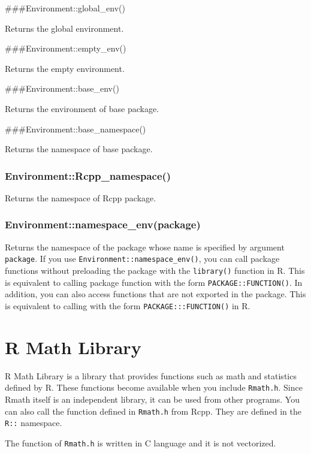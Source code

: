 \documentclass[]{book}
\begin{document}
\#\#\#Environment::global\_env()

Returns the global environment.

\#\#\#Environment::empty\_env()

Returns the empty environment.

\#\#\#Environment::base\_env()

Returns the environment of base package.

\#\#\#Environment::base\_namespace()

Returns the namespace of base package.

\hypertarget{environmentrcpp_namespace}{%
\subsection{Environment::Rcpp\_namespace()}\label{environmentrcpp_namespace}}

Returns the namespace of Rcpp package.

\hypertarget{environmentnamespace_envpackage}{%
\subsection{Environment::namespace\_env(package)}\label{environmentnamespace_envpackage}}

Returns the namespace of the package whose name is specified by argument \texttt{package}. If you use \texttt{Environment::namespace\_env()}, you can call package functions without preloading the package with the \texttt{library()} function in R. This is equivalent to calling package function with the form \texttt{PACKAGE::FUNCTION()}. In addition, you can also access functions that are not exported in the package. This is equivalent to calling with the form \texttt{PACKAGE:::FUNCTION()} in R.

\hypertarget{r-math-library}{%
\chapter{R Math Library}\label{r-math-library}}

R Math Library is a library that provides functions such as math and statistics defined by R. These functions become available when you include \texttt{Rmath.h}. Since Rmath itself is an independent library, it can be used from other programs. You can also call the function defined in \texttt{Rmath.h} from Rcpp. They are defined in the \texttt{R::} namespace.

The function of \texttt{Rmath.h} is written in C language and it is not vectorized.
\end{document}
